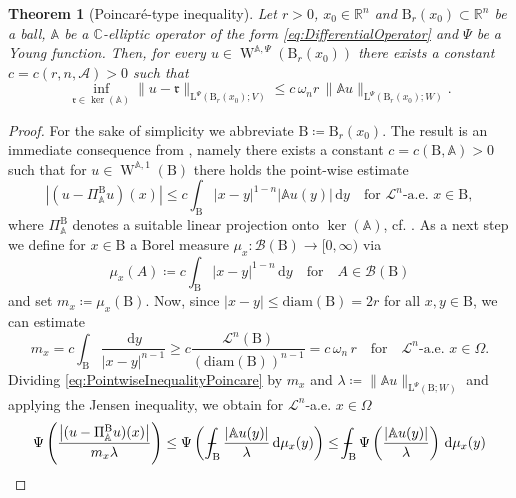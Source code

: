 \documentclass[a4paper,10pt,reqno,oneside]{amsart}
\numberwithin{equation}{section}
\newcommand{\R}{\mathbb R}
\newcommand{\C}{\mathbb C}
\newcommand{\ball}{\mathrm{B}}
\newcommand{\A}{\mathscr{A}}
\newcommand{\Aop}{\mathbb{A}}
\newcommand{\Leb}{\mathscr{L}}
\newcommand{\sobo}{\operatorname{W}}
\newcommand{\dx}[1]{\,\mathrm{d}#1}
\newcommand{\abs}[1]{\left\lvert#1\right\rvert}
\newcommand{\diam}{\mathrm{diam}}
\newcommand{\rfrak}{\mathfrak{r}}
\renewcommand{\L}{\mathrm{L}}
\def\Xint#1{\mathchoice
	{\XXint\displaystyle\textstyle{#1}}%
	{\XXint\textstyle\scriptstyle{#1}}%
	{\XXint\scriptstyle\scriptscriptstyle{#1}}%
	{\XXint\scriptscriptstyle\scriptscriptstyle{#1}}%
	\!\int}
\def\XXint#1#2#3{{\setbox0=\hbox{$#1{#2#3}{\int}$ }
		\vcenter{\hbox{$#2#3$ }}\kern-.6\wd0}}
\def\dashint{\Xint-}
\newtheorem{thm}{Theorem}[section]
\begin{document}
\begin{thm}[Poincar\'e-type inequality]
Let $r>0$, $x_0\in\R^n$ and $\ball_r(x_0)\subset\R^n$ be a ball, $\Aop$ be a $\C$-elliptic operator of the form \eqref{eq:DifferentialOperator} and $\Psi$  be a Young function. Then, for every $u\in \sobo^{\Aop,\Psi}(\ball_r(x_0))$ there exists a constant $c=c(r,n,\A)>0$ such that
\begin{equation}\label{eq:PoincareOrlicz}
	\inf_{\rfrak\in\ker(\Aop)}\|u-\rfrak\|_{\L^\Psi(\ball_r(x_0);V)} \leq c\,\omega_n r\,\|\Aop u\|_{\L^\Psi(\ball_r(x_0);W)}. 
\end{equation}
\end{thm}
\begin{proof}
	For the sake of simplicity we abbreviate $\ball\coloneqq \ball_r(x_0)$. The result is an immediate consequence from \cite[Proposition 3.8.]{DieningGmeineder}, namely there exists a constant $c=c(\ball,\Aop)>0$ such that for $u\in \sobo^{\Aop,1}(\ball)$ there holds the point-wise estimate
	\begin{equation}\label{eq:PointwiseInequalityPoincare}
		\abs{(u-\Pi^\ball_{\Aop} u)(x)} \leq c\int_\ball \abs{x-y}^{1-n} \abs{\Aop u(y)}\dx{y}\quad\mbox{for  }\Leb^n\mbox{-a.e. } x\in\ball,
	\end{equation}
	where $\Pi^\ball_{\Aop}$ denotes a suitable linear projection onto $\ker(\Aop)$, cf. \cite[Prop. 3.3]{DieningGmeineder}. As a next step we define for $x\in\ball$ a Borel measure $\mu_x\colon\mathscr{B}(\ball)\to [0,\infty)$ via
	\begin{equation*}
		\mu_x (A)\coloneqq c\int_\ball \abs{x-y}^{1-n} \dx{y}\quad\mbox{for}\quad A\in\mathscr{B}(\ball)
	\end{equation*}
	and set $m_x\coloneqq \mu_x(\ball)$. Now, since $\abs{x-y}\leq \diam(\ball) = 2r$ for all $x,y\in \ball$, we can estimate
	\begin{equation}\label{eq:LowerBoundMeasure_Poincare}
		m_x =c \int_\ball \frac{\dx{y}}{\abs{x-y}^{n-1}}\geq c\frac{\Leb^n(\ball)}{(\diam(\ball))^{n-1}} = c\,\omega_n\, r\quad \mbox{for}\quad \Leb^n\mbox{-a.e. }x\in\Omega. 
	\end{equation}
	Dividing \eqref{eq:PointwiseInequalityPoincare} by $m_x$ and $\lambda\coloneqq \|\Aop u\|_{\L^\Psi(\ball;W)}$ and applying the Jensen inequality, we obtain for $\Leb^n$-a.e. $x\in\Omega$
	\begin{align*}
		\Psi\left(\frac{\abs{(u-\Pi^\ball_{\Aop} u)(x)}}{m_x\lambda}\right) 
		\leq \Psi\left(\, \dashint_{\ball}  \frac{\abs{\Aop u(y)}}{\lambda}\dx{\mu_x(y)}\right)
		\leq \dashint_\ball\Psi\left(\frac{\abs{\Aop u(y)}}{\lambda}\right) \dx{\mu_x(y)}%

\end{align*}
\end{proof}
\end{document}
